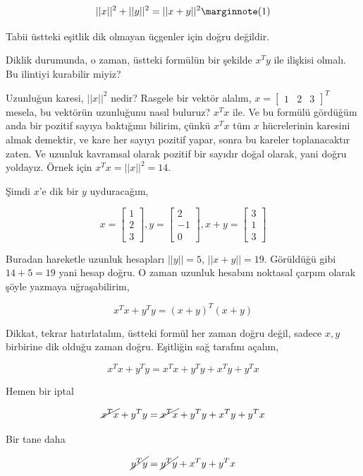 \documentclass[12pt,fleqn]{article}\usepackage{../../common}
\begin{document}
$$ 
||x||^2 + ||y||^2 = ||x+y||^2 
\mlabel{1}
$$

Tabii üstteki eşitlik dik olmayan üçgenler için doğru değildir. 

Diklik durumunda, o zaman, üstteki formülün bir şekilde $x^Ty$ ile ilişkisi
olmalı. Bu ilintiyi kurabilir miyiz?

Uzunluğun karesi, $||x||^2$ nedir? Rasgele bir vektör alalım, $x =
\left[\begin{array}{ccc} 1 & 2 & 3 \end{array}\right]^T$ mesela, bu vektörün
uzunluğunu nasıl buluruz? $x^Tx$ ile. Ve bu formülü gördüğüm anda bir pozitif
sayıya baktığımı bilirim, çünkü $x^Tx$ tüm $x$ hücrelerinin karesini almak
demektir, ve kare her sayıyı pozitif yapar, sonra bu kareler toplanacaktır
zaten. Ve uzunluk kavramsal olarak pozitif bir sayıdır doğal olarak, yani doğru
yoldayız. Örnek için $x^Tx=||x||^2=14$.

Şimdi $x$'e dik bir $y$ uyduracağım,

$$ 
x = \left[\begin{array}{r}
1 \\ 2 \\ 3
\end{array}\right],
y = \left[\begin{array}{r}
2 \\ -1 \\ 0
\end{array}\right], 
x+y = \left[\begin{array}{r}
3 \\ 1 \\ 3
\end{array}\right]
 $$

Buradan hareketle uzunluk hesapları $||y|| = 5$, $||x+y||=19$. Görüldüğü gibi
$14+5=19$ yani hesap doğru. O zaman uzunluk hesabını noktasal çarpım olarak
şöyle yazmaya uğraşabilirim,

$$ 
x^Tx + y^Ty = (x+y)^T(x+y)
 $$

Dikkat, tekrar hatırlatalım, üstteki formül her zaman doğru değil, sadece $x,y$
birbirine dik olduğu zaman doğru. Eşitliğin sağ tarafını açalım,

$$ 
x^Tx + y^Ty = x^Tx + y^Ty + x^Ty + y^Tx
$$

Hemen bir iptal

$$ 
\cancel{x^Tx} + y^Ty = \cancel{x^Tx} + y^Ty + x^Ty + y^Tx
$$

Bir tane daha

$$ 
\cancel{y^Ty} =  \cancel{y^Ty} + x^Ty + y^Tx
$$
\end{document}

